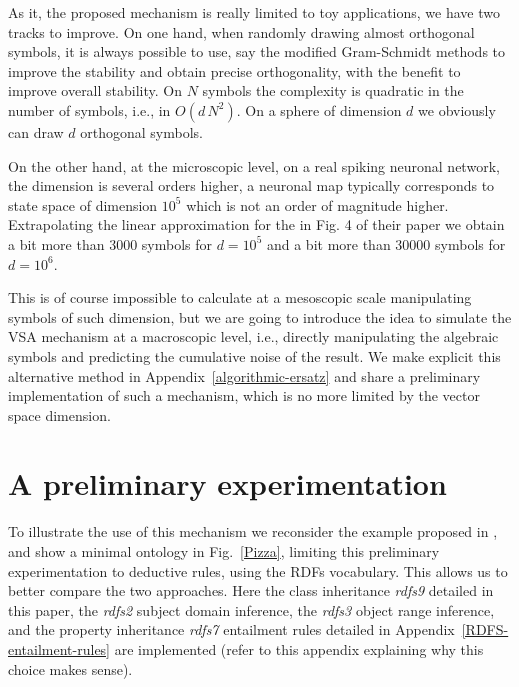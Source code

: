 \documentclass[sn-mathphys]{sn-jnl}
\begin{document}
As it, the proposed mechanism is really limited to toy applications, we have two tracks to improve. On one hand, when randomly drawing almost orthogonal symbols, it is always possible to use, say the modified Gram-Schmidt methods to improve the stability and obtain precise orthogonality, with the benefit to improve overall stability. On $N$ symbols the complexity is quadratic in the number of symbols, i.e., in $O(d\,N^2)$. On a sphere of dimension $d$ we obviously can draw $d$ orthogonal symbols.

On the other hand, at the microscopic level, on a real spiking neuronal network, the dimension is several orders higher, a neuronal map typically corresponds to state space of dimension $10^5$ which is not an order of magnitude higher.  Extrapolating the linear approximation for the \cite{schlegel_comparison_2020} in Fig. 4 of their paper we obtain a bit more than $3000$ symbols for $d=10^5$ and a bit more than $30000$ symbols for $d=10^6$. 

This is of course impossible to calculate at a mesoscopic scale manipulating symbols of such dimension, but we are going to introduce the idea to simulate the VSA mechanism at a macroscopic level, i.e., directly manipulating the algebraic symbols and predicting the cumulative noise of the result. We make explicit this alternative method in Appendix~\ref{algorithmic-ersatz} and share a preliminary implementation of such a mechanism, which is no more limited by the vector space dimension. 

\section{A preliminary experimentation}

To illustrate the use of this mechanism we reconsider the example proposed in \cite{mercier_ontology_2021}, and show a minimal ontology in Fig.~\ref{Pizza}, limiting this preliminary experimentation to deductive rules, using the RDFs vocabulary. This allows us to better compare the two approaches. Here the class inheritance \textit{rdfs9} detailed in this paper, the \textit{rdfs2} subject domain inference, the \textit{rdfs3} object range inference, and the property inheritance \textit{rdfs7} entailment rules  detailed in Appendix~\ref{RDFS-entailment-rules} are implemented (refer to this appendix explaining why this choice makes sense).
\end{document}
